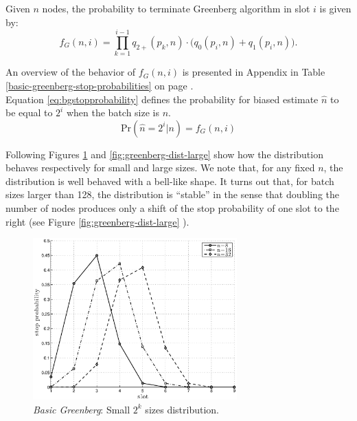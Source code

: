 \documentclass[11pt,a4paper,twoside,openright]{book}
\newcommand{\fg}{f_{G}}
\begin{document}
Given $n$ nodes, the probability to terminate Greenberg algorithm  in slot $i$ is given by:
\begin{equation}
\fg(n,i)=\prod_{k=1}^{i-1}q_{2+}(p_{k},n) \cdot \bigl( q_{0}(p_{i},n)+q_{1}(p_{i},n)\bigr)  .
\label{eq:bgstopprobability}
\end{equation}

An overview of the behavior of $\fg(n,i)$ is presented in Appendix in Table \ref{basic-greenberg-stop-probabilities} on page \pageref{basic-greenberg-stop-probabilities}.\\ Equation \eqref{eq:bgstopprobability} defines the probability for biased estimate $\hat{n}$ to be equal to $2^{i}$ when the batch size is $n$. 
\begin{equation}
\textrm{Pr}\left( \hat{n}=2^{i}|n\right)=\fg(n,i)  
\end{equation}

Following Figures \ref{fig:greenberg-dist-small} and \ref{fig:greenberg-dist-large} show how the distribution behaves respectively for small and large sizes.
We note that, for any fixed $n$, the distribution is well behaved with a bell-like shape. It turns out that, for batch sizes larger than 128, the distribution is ``stable'' in the sense that doubling the number of nodes produces only a shift of the stop probability of one slot to the right (see Figure \ref{fig:greenberg-dist-large} ).\\


\begin{figure}[htbp]
\begin{center}
\includegraphics[width=0.7\textwidth]{matlab/Greenberg_stop_prob/greenberg-stop-distribution-uniformity-init}
\caption{\emph{Basic Greenberg}:  Small $2^{k}$ sizes distribution.}
\label{fig:greenberg-dist-small}
\end{center}
\end{figure}
\end{document}
